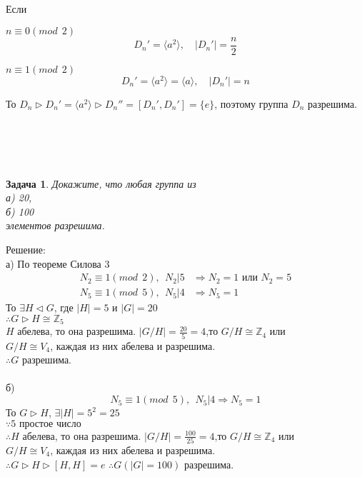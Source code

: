 \documentclass[a4paper,12pt]{article}
\theoremstyle{neosn}
\newtheorem{problem}{Задача}
\begin{document}
Если
\begin{enumerate}
    \begin{item}{$n \equiv 0 (mod \ \ 2)$}
        \[D_n'=\langle a^2 \rangle,\quad |D_n'|=\frac{n}{2}\]            
    \end{item}
    \begin{item}{$n \equiv 1 (mod \ \ 2)$}
        \[D_n'=\langle a^2 \rangle = \langle a \rangle,\quad |D_n'|=n\]
    \end{item}
\end{enumerate}
То $D_n \rhd D_n'=\langle a^2 \rangle \rhd D_n''=[D_n',D_n']=\{e\}$, поэтому группа $D_n$ разрешима.
\\
\\
\\
\\
\\
\begin{problem}
    Докажите, что любая группа из\\
    а) 20,\\
    б) 100 \\
    элементов разрешима.
\end{problem}
Решение:\\
а) По теореме Силова 3\\
\begin{align*}
    N_2 \equiv 1 (mod \ \ 2), \ \ N_2|5 &\Rightarrow N_2 = 1 \text{ или } N_2 = 5 \\
    N_5 \equiv 1(mod \ \ 5),\ \ N_5|4 &\Rightarrow N_5=1
\end{align*}
То $\exists H \lhd G$, где $|H| = 5$ и $|G| = 20$\\
$\therefore G \rhd H \cong \mathbb{Z}_5$\\
$H$ абелева, то она разрешима. $|G/H|=\frac{20}{5}=4$,то $G/H \cong \mathbb{Z}_4$ или\\
$G/H \cong V_4$, каждая из них абелева и разрешима.\\
$\therefore G$ разрешима.\\
\\
б)\\
$$
N_5 \equiv 1 (mod \ \ 5),\ \ N_5 | 4 \Rightarrow N_5 = 1
$$
То $G \rhd H$, $\exists |H|=5^2=25$\\
$\because 5 \text{ простое число}$\\
$\therefore H$ абелева, то она разрешима. $|G/H|=\frac{100}{25}=4$,то $G/H \cong \mathbb{Z}_4$ или\\
$G/H \cong V_4$, каждая из них абелева и разрешима.\\
$\therefore G \rhd H \rhd [H,H] = {e}$
$\therefore G(|G|=100)$ разрешима.
\end{document}
